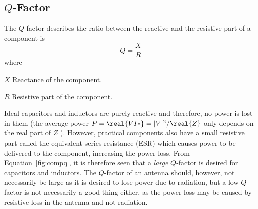 \subsection{$Q$-Factor}
The $Q$-factor describes the ratio between the reactive and the resistive part of a component is \cite{pozar2011microwave}
\begin{equation}
    \label{fig:compq}
    Q = \frac{X}{R}
\end{equation}
where
\begin{where}
\item[$X$] Reactance of the component.
\item[$R$] Resistive part of the component.
\end{where}
Ideal capacitors and inductors are purely reactive and therefore, no power is lost in them (the average power $P = \real{VI*} = |V|^2 / \real{Z}$ only depends on the real part of $Z$ \cite{irwin2011engineering}). However, practical components also have a small resistive part called the equivalent series resistance (ESR) which causes power to be delivered to the component, increasing the power loss. From Equation~\ref{fig:compq}, it is therefore seen that a \emph{large} $Q$-factor is desired for capacitors and inductors. The $Q$-factor of an antenna should, however, not necessarily be large as it is desired to lose power due to radiation, but a low $Q$-factor is not necessarily a good thing either, as the power loss may be caused by resistive loss in the antenna and not radiation.

